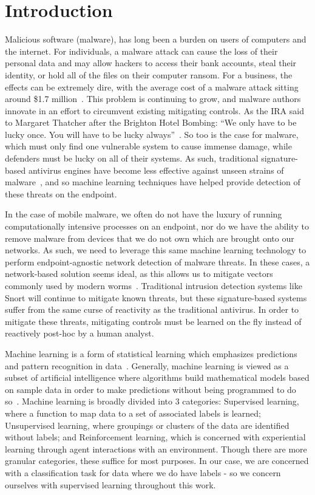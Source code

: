 \chapter{Introduction}
\label{chap:intro}

Malicious software (malware), has long been a burden on users of computers and the internet. 
For individuals, a malware attack can cause the loss of their personal data and may allow hackers to access their bank accounts, steal their identity, or hold all of the files on their computer ransom. 
For a business, the effects can be extremely dire, with the average cost of a malware attack sitting around \$1.7 million~\cite{seals2019threatlist}. 
This problem is continuing to grow, and malware authors innovate in an effort to circumvent existing mitigating controls. 
As the IRA said to Margaret Thatcher after the Brighton Hotel Bombing: ``We only have to be lucky once. You will have to be lucky always''~\cite{thomas1984this}. 
So too is the case for malware, which must only find one vulnerable system to cause immense damage, while defenders must be lucky on all of their systems. 
As such, traditional signature-based antivirus engines have become less effective against unseen strains of malware~\cite{oconnor2017how}, and so machine learning techniques have helped provide detection of these threats on the endpoint.

In the case of mobile malware, we often do not have the luxury of running computationally intensive processes on an endpoint, nor do we have the ability to remove malware from devices that we do not own which are brought onto our networks. 
As such, we need to leverage this same machine learning technology to perform endpoint-agnostic network detection of malware threats. 
In these cases, a network-based solution seems ideal, as this allows us to mitigate vectors commonly used by modern worms~\cite{mohurle2017brief}. 
Traditional intrusion detection systems like Snort will continue to mitigate known threats, but these signature-based systems suffer from the same curse of reactivity as the traditional antivirus. 
In order to mitigate these threats, mitigating controls must be learned on the fly instead of reactively post-hoc by a human analyst.

Machine learning is a form of statistical learning which emphasizes predictions and pattern recognition in data~\cite{james14introduction}.
Generally, machine learning is viewed as a subset of artificial intelligence where algorithms build mathematical models based on sample data in order to make predictions without being programmed to do so~\cite{bishop2006pattern}.
Machine learning is broadly divided into 3 categories: 
Supervised learning, where a function to map data to a set of associated labels is learned;
Unsupervised learning, where groupings or clusters of the data are identified without labels;
and Reinforcement learning, which is concerned with experiential learning through agent interactions with an environment.
Though there are more granular categories, these suffice for most purposes.
In our case, we are concerned with a classification task for data where we do have labels - so we concern ourselves with supervised learning throughout this work. 

